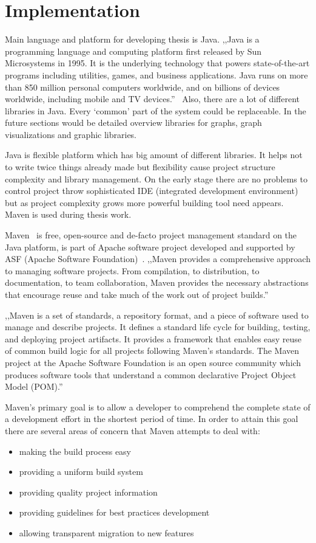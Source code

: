 \section{Implementation}
\label{sec:implementation}
Main language and platform for developing thesis is Java. ,,Java is a programming language and computing platform first released by Sun Microsystems in 1995. It is the underlying technology that powers state-of-the-art programs including utilities, games, and business applications. Java runs on more than 850 million personal computers worldwide, and on billions of devices worldwide, including mobile and TV devices.''~\cite{java_com} Also, there are a lot of different libraries in Java. Every `common' part of the system could be replaceable. In the future sections would be detailed overview libraries for graphs, graph visualizations and graphic libraries.


Java is flexible platform which has big amount of different libraries. It helps not to write twice things already made but flexibility cause project structure complexity and library management. On the early stage there are no problems to control project throw sophisticated IDE (integrated development environment) but as project complexity grows more powerful building tool need appears. Maven is used during thesis work.


Maven~\cite{MAVEN_HOME_PAGE} is free, open-source and de-facto project management standard on the Java platform, is part of Apache software project developed and supported by ASF (Apache Software Foundation)~\cite{APACHE_FOUNDATION_HOME_PAGE}. ,,Maven provides a comprehensive approach to managing software projects. From compilation, to distribution, to documentation, to team collaboration, Maven provides the necessary abstractions that encourage reuse and take much of the work out of project builds.''~\cite{MAVEN_BOOK_1}


,,Maven is a set of standards, a repository format, and a piece of software used to manage and describe projects. It defines a standard life cycle for building, testing, and deploying project artifacts. It provides a framework that enables easy reuse of common build logic for all projects following Maven's standards. The Maven project at the Apache Software Foundation is an open source community which produces software tools that understand a common declarative Project Object Model (POM).''~\cite{MAVEN_BOOK_2}


Maven's primary goal is to allow a developer to comprehend the complete state of a development effort in the shortest period of time. In order to attain this goal there are several areas of concern that Maven attempts to deal with:
\begin{itemize}
	\item making the build process easy
	\item providing a uniform build system
	\item providing quality project information
	\item providing guidelines for best practices development
	\item allowing transparent migration to new features
\end{itemize}


